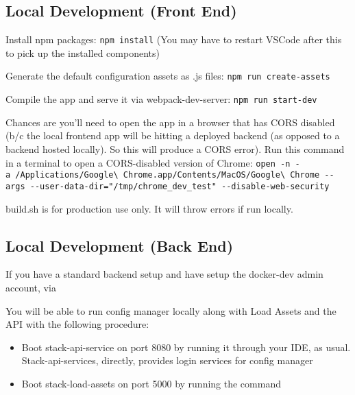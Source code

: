 \hypertarget{local-development-front-end}{%
\subsection{Local Development (Front
End)}\label{local-development-front-end}}

Install npm packages: \texttt{npm\ install} (You may have to restart
VSCode after this to pick up the installed components)

Generate the default configuration assets as .js files:
\texttt{npm\ run\ create-assets}

Compile the app and serve it via webpack-dev-server:
\texttt{npm\ run\ start-dev}

Chances are you'll need to open the app in a browser that has CORS
disabled (b/c the local frontend app will be hitting a deployed backend
(as opposed to a backend hosted locally). So this will produce a CORS
error). Run this command in a terminal to open a CORS-disabled version
of Chrome:
\texttt{open\ -n\ -a\ /Applications/Google\textbackslash{}\ Chrome.app/Contents/MacOS/Google\textbackslash{}\ Chrome\ -\/-args\ -\/-user-data-dir="/tmp/chrome\_dev\_test"\ -\/-disable-web-security}

build.sh is for production use only. It will throw errors if run
locally.

\hypertarget{local-development-back-end}{%
\subsection{Local Development (Back
End)}\label{local-development-back-end}}

If you have a standard backend setup and have setup the docker-dev admin
account, via

\begin{Shaded}
\begin{Highlighting}[]
\end{Highlighting}
\end{Shaded}

You will be able to run config manager locally along with Load Assets
and the API with the following procedure:

\begin{itemize}
\tightlist
\item
  Boot stack-api-service on port 8080 by running it through your IDE, as
  usual. Stack-api-services, directly, provides login services for
  config manager
\item
  Boot stack-load-assets on port 5000 by running the command
\end{itemize}

